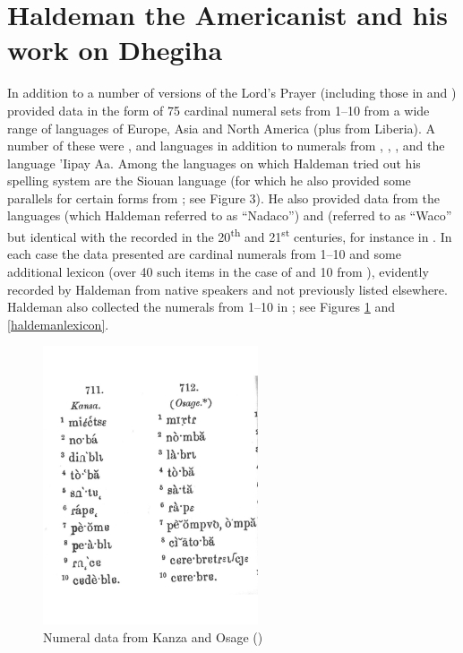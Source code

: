 \documentclass[output=paper]{LSP/langsci}
\begin{document}
\section{Haldeman the Americanist and his work on Dhegiha}  

 \largerpage[-1]
In addition to a number of versions of the Lord's Prayer (including those in  and ) \citet{Haldeman1860}  provided data in the form of 75 cardinal numeral sets from 1--10 from a wide range of languages of Europe, Asia and North America (plus  from Liberia).  A number of these were ,  and  languages in addition to numerals from , , ,  and the  language 'Iipay Aa. Among the languages on which Haldeman tried out his spelling system are the  Siouan language  (for which he also provided some  parallels for certain forms from \citealt{Riggs1852}; see Figure 3).  He also provided data from the  languages  (which Haldeman referred to as ``Nadaco'') and  (referred to as ``Waco'' but identical with the  recorded in the 20\textsuperscript{th} and 21\textsuperscript{st} centuries, for instance in \citet{Rood1975}. In each case the data presented are cardinal numerals from 1--10 and some additional lexicon (over 40 such items in the case of  and 10 from ), evidently recorded by Haldeman from native speakers and not previously listed elsewhere. Haldeman also collected the numerals from 1--10 in ; see Figures \ref{haldemannumerals} and \ref{haldemanlexicon}.   

\begin{figure}
\centering
\caption{Numeral data from {Kanza} and {Osage} (\citealt[146, \S711, 712]{Haldeman1860})} \label{haldemannumerals}
\includegraphics[width=2.5in,angle=-2]{figures/GrantNumerals}
\end{figure}
\end{document}

